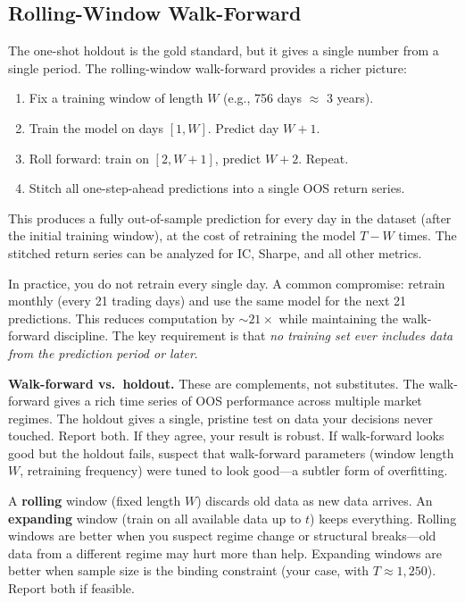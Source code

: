 \subsection{Rolling-Window Walk-Forward}

The one-shot holdout is the gold standard, but it gives a single number from a single period.  The rolling-window walk-forward provides a richer picture:

\begin{enumerate}[nosep]
  \item Fix a training window of length $W$ (e.g., 756 days $\approx$ 3 years).
  \item Train the model on days $[1, W]$.  Predict day $W+1$.
  \item Roll forward: train on $[2, W+1]$, predict $W+2$.  Repeat.
  \item Stitch all one-step-ahead predictions into a single OOS return series.
\end{enumerate}

This produces a fully out-of-sample prediction for every day in the dataset (after the initial training window), at the cost of retraining the model $T - W$ times.  The stitched return series can be analyzed for IC, Sharpe, and all other metrics.

In practice, you do not retrain every single day.  A common compromise: retrain monthly (every 21 trading days) and use the same model for the next 21 predictions.  This reduces computation by $\sim 21\times$ while maintaining the walk-forward discipline.  The key requirement is that \emph{no training set ever includes data from the prediction period or later}.

\textbf{Walk-forward vs.\ holdout.}  These are complements, not substitutes.  The walk-forward gives a rich time series of OOS performance across multiple market regimes.  The holdout gives a single, pristine test on data your decisions never touched.  Report both.  If they agree, your result is robust.  If walk-forward looks good but the holdout fails, suspect that walk-forward parameters (window length $W$, retraining frequency) were tuned to look good---a subtler form of overfitting.

\begin{keyidea}
A \textbf{rolling} window (fixed length $W$) discards old data as new data arrives.  An \textbf{expanding} window (train on all available data up to $t$) keeps everything.  Rolling windows are better when you suspect regime change or structural breaks---old data from a different regime may hurt more than help.  Expanding windows are better when sample size is the binding constraint (your case, with $T \approx 1{,}250$).  Report both if feasible.
\end{keyidea}


